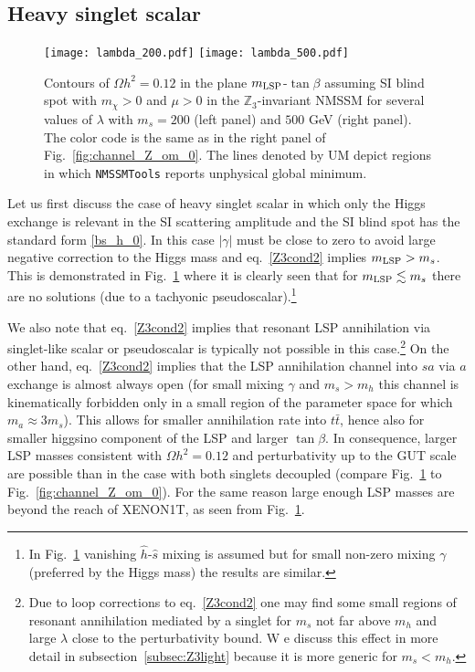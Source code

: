 \documentclass[12pt,twoside]{article}
\begin{document}
\subsection{Heavy singlet scalar}

%
\begin{figure}
\center
\texttt{[image: lambda\_200.pdf]}
\hspace{-5ex}
\texttt{[image: lambda\_500.pdf]}
\caption{Contours of $\Omega h^2=0.12$ in the plane $m_{\rm LSP}$-$\tan\beta$ assuming SI blind spot with $m_\chi>0$ and $\mu>0$ in the
$\mathbb{Z}_3$-invariant NMSSM for several values of $\lambda$ with $m_s=200$ (left panel) and $500$ GeV (right panel). The color code is the same as
in the right panel of Fig.~\ref{fig:channel_Z_om_0}. The lines denoted 
by UM depict regions in which {\tt NMSSMTools} reports unphysical global minimum.}
\label{Z3_heavy_s1}
\end{figure}
%
%

Let us first discuss the case of heavy singlet scalar in which only 
the Higgs exchange is relevant in the SI scattering amplitude and the 
SI blind spot has the standard form \eqref{bs_h_0}. In this case $|\gamma|$ 
must be close to zero to avoid large negative correction to the Higgs 
mass and eq.~\eqref{Z3cond2} implies $m_{\rm LSP}>m_s$. This is demonstrated 
in Fig.~\ref{Z3_heavy_s1} where it is clearly seen that for 
$m_{\rm LSP}\lesssim m_s$ there are no solutions (due to a tachyonic 
pseudoscalar).\footnote{In Fig.~\ref{Z3_heavy_s1} vanishing 
$\hat{h}$-$\hat{s}$ mixing is assumed but  for small non-zero mixing $\gamma$ (preferred by the Higgs mass)  the results are similar.  } 





We also note that eq.~\eqref{Z3cond2} implies that resonant LSP annihilation 
via singlet-like scalar or pseudoscalar is typically not possible in this 
case.\footnote{Due to loop corrections to eq.~\eqref{Z3cond2} one may find 
some small regions of resonant annihilation mediated by a singlet for $m_s$ 
not far above $m_h$ and large $\lambda$ close to the perturbativity bound. W
e discuss this effect in more detail in subsection~\ref{subsec:Z3light}
because it is more generic for $m_s<m_h$.}
On the other hand, eq.~\eqref{Z3cond2} implies that 
the LSP annihilation channel into $sa$ via $a$ exchange is 
almost always open (for small mixing $\gamma$ and $m_s>m_h$ 
this channel is kinematically forbidden only in a small 
region of the parameter space for which $m_a\approx3m_s$).
This allows for smaller annihilation rate into $t\bar{t}$, hence also for smaller higgsino component of the LSP
and larger $\tan\beta$. In consequence, larger LSP masses consistent with $\Omega h^2=0.12$ and perturbativity up to the GUT scale are possible than
in the case with both singlets decoupled 
(compare Fig.~\ref{Z3_heavy_s1} to Fig.~\ref{fig:channel_Z_om_0}). For the same reason large enough LSP masses are beyond the reach of XENON1T, as
seen from Fig.~\ref{Z3_heavy_s1}. 
\end{document}
